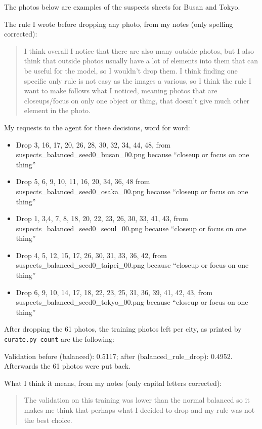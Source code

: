 \documentclass[11pt]{article}
\begin{document}
The photos below are examples of the suspects sheets for Busan and Tokyo.


The rule I wrote before dropping any photo, from my notes (only spelling corrected):
\begin{quote}\small
I think overall I notice that there are also many outside photos, but I also think that outside photos usually have a lot of elements into them that can be useful for the model, so I wouldn't drop them. I think finding one specific only rule is not easy as the images a various, so I think the rule I want to make follows what I noticed, meaning photos that are closeups/focus on only one object or thing, that doesn't give much other element in the photo.
\end{quote}

My requests to the agent for these decisions, word for word:
\begin{itemize}\small
\item Drop 3, 16, 17, 20, 26, 28, 30, 32, 34, 44, 48, from suspects\_balanced\_seed0\_busan\_00.png because “closeup or focus on one thing”
\item Drop 5, 6, 9, 10, 11, 16, 20, 34, 36, 48 from suspects\_balanced\_seed0\_osaka\_00.png  because “closeup or focus on one thing”
\item Drop 1, 3,4, 7, 8, 18, 20, 22, 23, 26, 30, 33, 41, 43, from suspects\_balanced\_seed0\_seoul\_00.png because “closeup or focus on one thing”
\item Drop 4, 5, 12, 15, 17, 26, 30, 31, 33, 36, 42, from suspects\_balanced\_seed0\_taipei\_00.png because “closeup or focus on one thing”
\item Drop 6, 9, 10, 14, 17, 18, 22, 23, 25, 31, 36, 39, 41, 42, 43, from suspects\_balanced\_seed0\_tokyo\_00.png because “closeup or focus on one thing”
\end{itemize}

After dropping the 61 photos, the training photos left per city, as printed by \texttt{curate.py count} are the following:

Validation before (balanced): 0.5117; after (balanced\_rule\_drop): 0.4952. Afterwards the 61 photos were put back.

What I think it means, from my notes (only capital letters corrected):
\begin{quote}\small
The validation on this training was lower than the normal balanced so it makes me think that perhaps what I decided to drop and my rule was not the best choice.
\end{quote}
\end{document}
